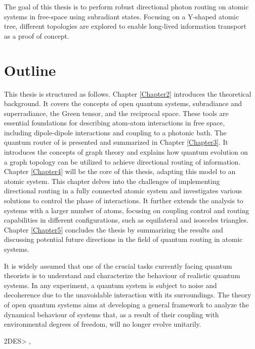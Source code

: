 \vspace{0.5cm}
\noindent
The goal of this thesis is
to perform robust directional photon routing on atomic systems in free-space using subradiant states.
Focusing on a Y-shaped atomic tree, different topologies are explored to enable long-lived information transport as a proof of concept.

    \section{Outline}
This thesis is structured as follows.
Chapter \ref{Chapter2} introduces the theoretical background.
It covers the concepts of open quantum systems,
subradiance and superradiance, the Green tensor, and the reciprocal space.
These tools are essential foundations for describing atom-atom interactions in free space,
including dipole-dipole interactions and coupling to a photonic bath.
The quantum router of \cite{Startingpoint} is presented and summarized in Chapter \ref{Chapter3}.
It introduces the concepts of graph theory and explains how quantum evolution on a graph topology can be utilized to achieve directional routing of information.
Chapter \ref{Chapter4} will be the core of this thesis, adapting this model to an atomic system.
This chapter delves into the challenges of implementing directional routing in a fully connected atomic system and investigates various solutions to control the phase of interactions.
It further extends the analysis to systems with a larger number of atoms, focusing on coupling control and routing capabilities in different configurations, such as equilateral and isosceles triangles.
Chapter \ref{Chapter5} concludes the thesis by summarizing the results and discussing potential future directions in the field of quantum routing in atomic systems.

\newline
\newline
It is widely assumed that one of the crucial tasks currently facing quantum theorists
is to understand and characterize the behaviour of realistic quantum systems. In
any experiment, a quantum system is subject to noise and decoherence due to the
unavoidable interaction with its surroundings. The theory of open quantum systems
aims at developing a general framework to analyze the dynamical behaviour of systems
that, as a result of their coupling with environmental degrees of freedom, will no
longer evolve unitarily. \cite{Rivas_2010}

\newline
\newline
2DES> \cite{krumland2023twodimensional}, \cite{Segarra-Martí2018}